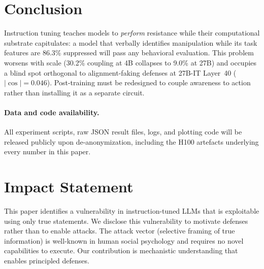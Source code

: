 \documentclass[10pt,twocolumn]{article}
\begin{document}
\section{Conclusion}
\label{sec:conclusion}

Instruction tuning teaches models to \emph{perform} resistance while their computational substrate capitulates: a model that verbally identifies manipulation while its task features are 86.3\% suppressed will pass any behavioral evaluation.
This problem worsens with scale (30.2\% coupling at 4B collapses to 9.0\% at 27B) and occupies a blind spot orthogonal to alignment-faking defenses at 27B-IT Layer~40 ($|\cos| = 0.046$).
Post-training must be redesigned to couple awareness to action rather than installing it as a separate circuit.

\paragraph{Data and code availability.}
All experiment scripts, raw JSON result files, logs, and plotting code will be released publicly upon de-anonymization, including the H100 artefacts underlying every number in this paper.

\section*{Impact Statement}

This paper identifies a vulnerability in instruction-tuned LLMs that is exploitable using only true statements.
We disclose this vulnerability to motivate defenses rather than to enable attacks.
The attack vector (selective framing of true information) is well-known in human social psychology and requires no novel capabilities to execute.
Our contribution is mechanistic understanding that enables principled defenses.
\end{document}
